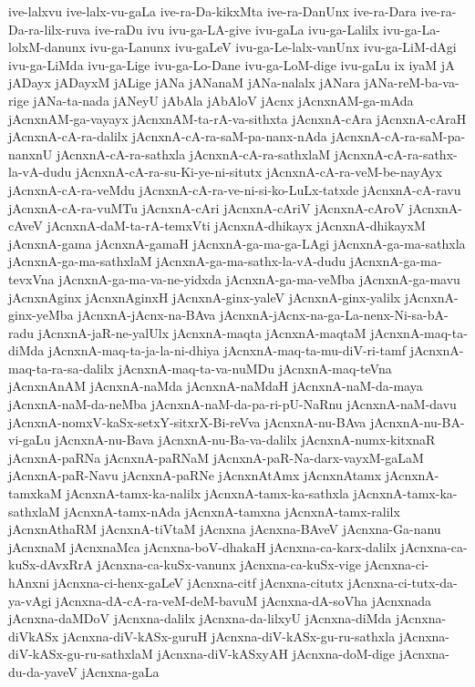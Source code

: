 {ive-lalxvu
ive-lalx-vu-gaLa
ive-ra-Da-kikxMta
ive-ra-DanUnx
ive-ra-Dara
ive-ra-Da-ra-lilx-ruva
ive-raDu
ivu
ivu-ga-LA-give
ivu-gaLa
ivu-ga-Lalilx
ivu-ga-La-lolxM-danunx
ivu-ga-Lanunx
ivu-gaLeV
ivu-ga-Le-lalx-vanUnx
ivu-ga-LiM-dAgi
ivu-ga-LiMda
ivu-ga-Lige
ivu-ga-Lo-Dane
ivu-ga-LoM-dige
ivu-gaLu
ix
iyaM
jA
jADayx
jADayxM
jALige
jANa
jANanaM
jANa-nalalx
jANara
jANa-reM-ba-va-rige
jANa-ta-nada
jANeyU
jAbAla
jAbAloV
jAcnx
jAcnxnAM-ga-mAda
jAcnxnAM-ga-vayayx
jAcnxnAM-ta-rA-va-sithxta
jAcnxnA-cAra
jAcnxnA-cAraH
jAcnxnA-cA-ra-dalilx
jAcnxnA-cA-ra-saM-pa-nanx-nAda
jAcnxnA-cA-ra-saM-pa-nanxnU
jAcnxnA-cA-ra-sathxla
jAcnxnA-cA-ra-sathxlaM
jAcnxnA-cA-ra-sathx-la-vA-dudu
jAcnxnA-cA-ra-su-Ki-ye-ni-situtx
jAcnxnA-cA-ra-veM-be-nayAyx
jAcnxnA-cA-ra-veMdu
jAcnxnA-cA-ra-ve-ni-si-ko-LuLx-tatxde
jAcnxnA-cA-ravu
jAcnxnA-cA-ra-vuMTu
jAcnxnA-cAri
jAcnxnA-cAriV
jAcnxnA-cAroV
jAcnxnA-cAveV
jAcnxnA-daM-ta-rA-temxVti
jAcnxnA-dhikayx
jAcnxnA-dhikayxM
jAcnxnA-gama
jAcnxnA-gamaH
jAcnxnA-ga-ma-ga-LAgi
jAcnxnA-ga-ma-sathxla
jAcnxnA-ga-ma-sathxlaM
jAcnxnA-ga-ma-sathx-la-vA-dudu
jAcnxnA-ga-ma-tevxVna
jAcnxnA-ga-ma-va-ne-yidxda
jAcnxnA-ga-ma-veMba
jAcnxnA-ga-mavu
jAcnxnAginx
jAcnxnAginxH
jAcnxnA-ginx-yaleV
jAcnxnA-ginx-yalilx
jAcnxnA-ginx-yeMba
jAcnxnA-jAcnx-na-BAva
jAcnxnA-jAcnx-na-ga-La-nenx-Ni-sa-bA-radu
jAcnxnA-jaR-ne-yalUlx
jAcnxnA-maqta
jAcnxnA-maqtaM
jAcnxnA-maq-ta-diMda
jAcnxnA-maq-ta-ja-la-ni-dhiya
jAcnxnA-maq-ta-mu-diV-ri-tamf
jAcnxnA-maq-ta-ra-sa-dalilx
jAcnxnA-maq-ta-va-nuMDu
jAcnxnA-maq-teVna
jAcnxnAnAM
jAcnxnA-naMda
jAcnxnA-naMdaH
jAcnxnA-naM-da-maya
jAcnxnA-naM-da-neMba
jAcnxnA-naM-da-pa-ri-pU-NaRnu
jAcnxnA-naM-davu
jAcnxnA-nomxV-kaSx-setxY-sitxrX-Bi-reVva
jAcnxnA-nu-BAva
jAcnxnA-nu-BA-vi-gaLu
jAcnxnA-nu-Bava
jAcnxnA-nu-Ba-va-dalilx
jAcnxnA-numx-kitxnaR
jAcnxnA-paRNa
jAcnxnA-paRNaM
jAcnxnA-paR-Na-darx-vayxM-gaLaM
jAcnxnA-paR-Navu
jAcnxnA-paRNe
jAcnxnAtAmx
jAcnxnAtamx
jAcnxnA-tamxkaM
jAcnxnA-tamx-ka-nalilx
jAcnxnA-tamx-ka-sathxla
jAcnxnA-tamx-ka-sathxlaM
jAcnxnA-tamx-nAda
jAcnxnA-tamxna
jAcnxnA-tamx-ralilx
jAcnxnAthaRM
jAcnxnA-tiVtaM
jAcnxna
jAcnxna-BAveV
jAcnxna-Ga-nanu
jAcnxnaM
jAcnxnaMca
jAcnxna-boV-dhakaH
jAcnxna-ca-karx-dalilx
jAcnxna-ca-kuSx-dAvxRrA
jAcnxna-ca-kuSx-vanunx
jAcnxna-ca-kuSx-vige
jAcnxna-ci-hAnxni
jAcnxna-ci-henx-gaLeV
jAcnxna-citf
jAcnxna-citutx
jAcnxna-ci-tutx-da-ya-vAgi
jAcnxna-dA-cA-ra-veM-deM-bavuM
jAcnxna-dA-soVha
jAcnxnada
jAcnxna-daMDoV
jAcnxna-dalilx
jAcnxna-da-lilxyU
jAcnxna-diMda
jAcnxna-diVkASx
jAcnxna-diV-kASx-guruH
jAcnxna-diV-kASx-gu-ru-sathxla
jAcnxna-diV-kASx-gu-ru-sathxlaM
jAcnxna-diV-kASxyAH
jAcnxna-doM-dige
jAcnxna-du-da-yaveV
jAcnxna-gaLa
}
